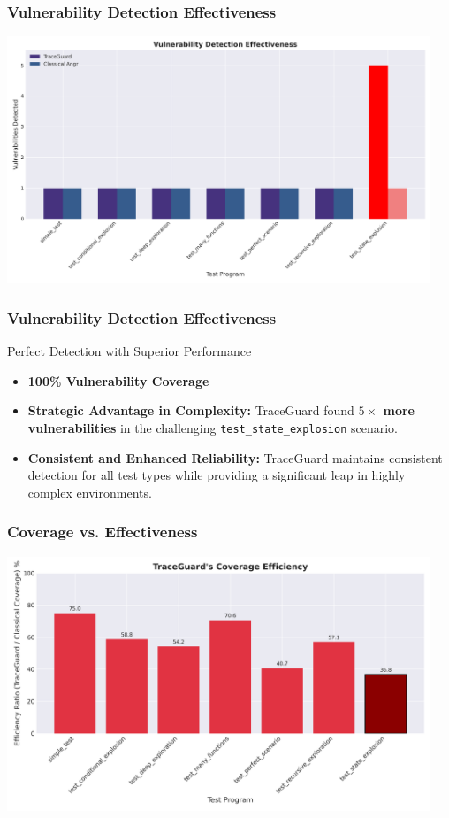 \documentclass[aspectratio=169]{beamer}
\begin{document}
\begin{frame}
    \frametitle{Vulnerability Detection Effectiveness}
    \centering
    \includegraphics[width=0.95\textwidth]{./pic/vulnerability_detection_effectiveness.png}
\end{frame}

\begin{frame}
    \frametitle{Vulnerability Detection Effectiveness}
    \begin{evaluation}{Perfect Detection with Superior Performance}
        \begin{itemize}
            \item \textbf{100\% Vulnerability Coverage}
            \item \textbf{Strategic Advantage in Complexity:} TraceGuard found \textbf{$5 \times$ more vulnerabilities} in the challenging \texttt{test\_state\_explosion} scenario.
            \item \textbf{Consistent and Enhanced Reliability:} TraceGuard maintains consistent detection for all test types while providing a significant leap in highly complex environments.
        \end{itemize}
    \end{evaluation}
\end{frame}

\begin{frame}
    \frametitle{Coverage vs. Effectiveness}
    \centering
    \includegraphics[width=0.95\textwidth]{./pic/coverage_efficiency.png}
\end{frame}
\end{document}
